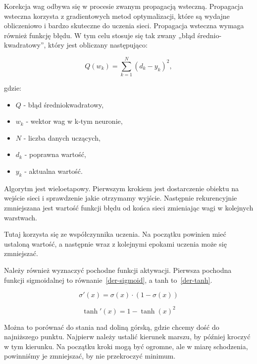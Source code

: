     Korekcja wag odbywa się w procesie zwanym propagacją wsteczną.
    Propagacja wsteczna korzysta z gradientowych metod optymalizacji, które są wydajne obliczeniowo i bardzo skuteczne do uczenia sieci.
    Propagacja wsteczna wymaga również funkcję błędu.
    W tym celu stosuje się tak zwany „błąd średnio-kwadratowy”, który jest obliczany następująco:

    \begin{equation}
        Q(w_k) = \sum_{k=1}^{N}{(d_k - y_k) ^ 2},
    \end{equation}

    gdzie:

    \begin{itemize}
        \item $Q$ - błąd średniokwadratowy,
        \item $w_k$ - wektor wag w k-tym neuronie,
        \item $N$ - liczba danych uczących,
        \item $d_k$ - poprawna wartość,
        \item $y_k$ - aktualna wartość.
    \end{itemize}

    Algorytm jest wieloetapowy.
    Pierwszym krokiem jest dostarczenie obiektu na wejście sieci i sprawdzenie jakie otrzymamy wyjście.
    Następnie rekurencyjnie zmniejszana jest wartość funkcji błędu od końca sieci zmieniając wagi w kolejnych warstwach.

    Tutaj korzysta się ze współczynnika uczenia.
    Na początku powinien mieć ustaloną wartość, a następnie wraz z kolejnymi epokami uczenia może się zmniejszać.

    Należy również wyznaczyć pochodne funkcji aktywacji.
    Pierwsza pochodna funkcji sigmoidalnej to równanie~\ref{der-sigmoid}, a tanh to~\ref{der-tanh}.

    \begin{equation}
        \sigma'(x) = \sigma(x) \cdot (1 - \sigma(x))
        \label{der-sigmoid}
    \end{equation}

    \begin{equation}
        \tanh'(x) = 1 - \tanh(x)^2
        \label{der-tanh}
    \end{equation}

    Można to porównać do stania nad doliną górską, gdzie chcemy dość do najniższego punktu.
    Najpierw należy ustalić kierunek marszu, by później kroczyć w tym kierunku.
    Na początku kroki mogą być ogromne, ale w miarę schodzenia, powinniśmy je zmniejszać, by nie przekroczyć minimum.

